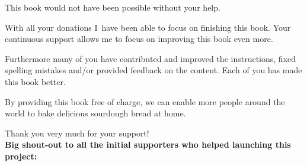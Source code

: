 This book would not have been possible without your help.

With all your donations I~have been able to focus on finishing
this book. Your continuous support allows me to focus
on improving this book even more.

Furthermore many of you have contributed and improved the
instructions, fixed spelling mistakes and/or provided
feedback on the content. Each of you has made this book
better.

By providing this book free of charge,
we can enable more people around the world to bake delicious sourdough
bread at home.

Thank you very much for your support!\\

\textbf{Big shout-out to all the initial supporters who helped launching this
project:\\}


